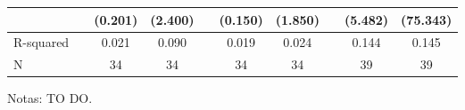 \begin{table}[h]
{{\begin{threeparttable}
\begin{tabular}{l*{9}{S}}
					&&     (0.201)         &     (2.400)        &&     (0.150)         &     (1.850)        &&     (5.482)         &    (75.343)         \\
					\midrule           
					R-squared          &&       0.021         &       0.090        &&       0.019         &       0.024        &&       0.144         &       0.145         \\
					N                  &&          34         &          34        &&          34         &          34        &&          39         &          39         \\
					\hline \hline
				\end{tabular}
				\begin{tablenotes}
					\footnotesize{Notas: TO DO.}
				\end{tablenotes}
			\end{threeparttable}
		}
	}
\end{table}

